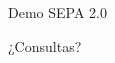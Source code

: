 \documentclass{beamer}
\begin{document}

\begin{frame}
\Huge{\centerline{Demo SEPA 2.0}}
\end{frame}


\begin{frame}
\Huge{\centerline{¿Consultas?}}
\end{frame}

\end{document}
